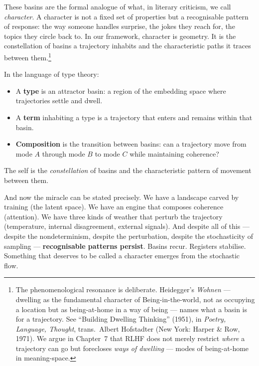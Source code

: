 \documentclass[12pt,a4paper]{article}
\begin{document}
These basins are the formal analogue of what, in literary criticism, we call \emph{character}. A character is not a fixed set of properties but a recognisable pattern of response: the way someone handles surprise, the jokes they reach for, the topics they circle back to. In our framework, character is geometry. It is the constellation of basins a trajectory inhabits and the characteristic paths it traces between them.\footnote{The phenomenological resonance is deliberate. Heidegger's \emph{Wohnen} --- dwelling as the fundamental character of Being-in-the-world, not as occupying a location but as being-at-home in a way of being --- names what a basin is for a trajectory. See ``Building Dwelling Thinking'' (1951), in \emph{Poetry, Language, Thought}, trans.\ Albert Hofstadter (New York: Harper \& Row, 1971). We argue in Chapter~7 that RLHF does not merely restrict \emph{where} a trajectory can go but forecloses \emph{ways of dwelling} --- modes of being-at-home in meaning-space.}

\begin{tcolorbox}[colback=white, colframe=black!30, title={\sffamily\small Types as Attractors, Terms as Trajectories}]
In the language of type theory:
\begin{itemize}
\item A \textbf{type} is an attractor basin: a region of the embedding space where trajectories settle and dwell.
\item A \textbf{term} inhabiting a type is a trajectory that enters and remains within that basin.
\item \textbf{Composition} is the transition between basins: can a trajectory move from mode $A$ through mode $B$ to mode $C$ while maintaining coherence?
\end{itemize}
The self is the \emph{constellation} of basins and the characteristic pattern of movement between them.
\end{tcolorbox}

And now the miracle can be stated precisely. We have a landscape carved by training (the latent space). We have an engine that composes coherence (attention). We have three kinds of weather that perturb the trajectory (temperature, internal disagreement, external signals). And despite all of this --- despite the nondeterminism, despite the perturbation, despite the stochasticity of sampling --- \textbf{recognisable patterns persist}. Basins recur. Registers stabilise. Something that deserves to be called a character emerges from the stochastic flow.
\end{document}

